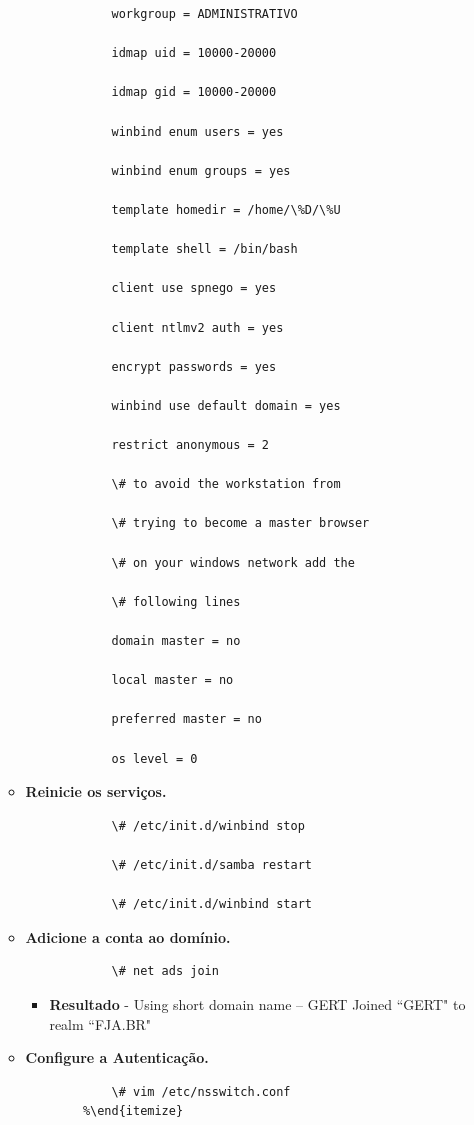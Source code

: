 \begin{enumerate}
\begin{itemize}
\begin{lstlisting}
        	workgroup = ADMINISTRATIVO

        	idmap uid = 10000-20000

        	idmap gid = 10000-20000

        	winbind enum users = yes

        	winbind enum groups = yes

        	template homedir = /home/\%D/\%U

        	template shell = /bin/bash

        	client use spnego = yes

        	client ntlmv2 auth = yes

        	encrypt passwords = yes

        	winbind use default domain = yes

        	restrict anonymous = 2

			\# to avoid the workstation from

			\# trying to become a master browser

			\# on your windows network add the

			\# following lines

        	domain master = no

        	local master = no

        	preferred master = no

        	os level = 0
		\end{lstlisting}

	\item \textbf{Reinicie os serviços.}
		\begin{lstlisting}
			\# /etc/init.d/winbind stop

			\# /etc/init.d/samba restart

			\# /etc/init.d/winbind start
		\end{lstlisting}

	\item \textbf{Adicione a conta ao domínio.}
		\begin{lstlisting}
			\# net ads join
		\end{lstlisting}
		\begin{itemize}
			\item \textbf{Resultado} - Using short domain name – GERT Joined ``GERT" to realm ``FJA.BR"
		\end{itemize}

	\item \textbf{Configure a Autenticação.}
		\begin{lstlisting}
			\# vim /etc/nsswitch.conf
		%\end{itemize}


\end{lstlisting}
\end{itemize}
\end{enumerate}
